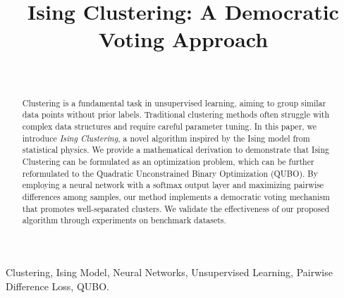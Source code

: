 \documentclass[journal]{IEEEtran}
\begin{document}

\title{
Ising Clustering: A Democratic Voting Approach\\
}

\author{\\
}


\maketitle

\begin{abstract}
Clustering is a fundamental task in unsupervised learning, aiming to group similar data points without prior labels. Traditional clustering methods often struggle with complex data structures and require careful parameter tuning. In this paper, we introduce \textit{Ising Clustering}, a novel algorithm inspired by the Ising model from statistical physics. We provide a mathematical derivation to demonstrate that Ising Clustering can be formulated as an optimization problem, which can be further reformulated to the Quadratic Unconstrained Binary Optimization (QUBO). By employing a neural network with a softmax output layer and maximizing pairwise differences among samples, our method implements a democratic voting mechanism that promotes well-separated clusters. We validate the effectiveness of our proposed algorithm through experiments on benchmark datasets.
\end{abstract}

\begin{IEEEkeywords}
Clustering, Ising Model, Neural Networks, Unsupervised Learning, Pairwise Difference Loss, QUBO.
\end{IEEEkeywords}
\end{document}
